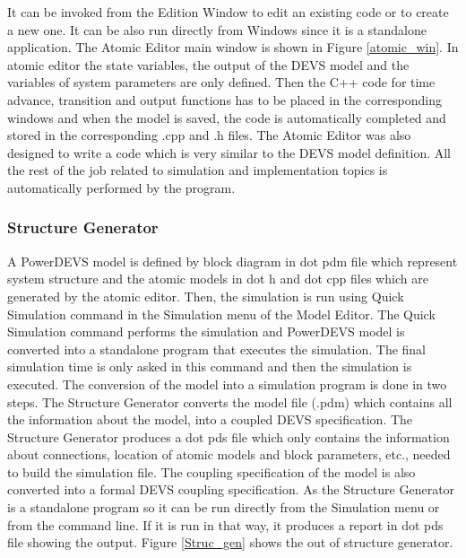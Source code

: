 \documentclass[titlepage]{article}%
\begin{document}
{It can be invoked from the Edition Window to edit an existing code or to create a new one. It can be also run directly from Windows since it is a standalone application. The Atomic Editor main window is shown in Figure \ref{atomic_win}. In atomic editor the state variables, the output of the DEVS model and the variables of system parameters are only defined. Then the C++ code for time advance, transition and output functions has to be placed in the corresponding windows and when the model is saved, the code is automatically completed and stored in the corresponding .cpp and .h files. The Atomic Editor was also designed to write a code which is very similar to the DEVS model definition. All the rest of the job related to simulation and implementation topics is automatically performed by the program.
\subsubsection{Structure Generator}
A PowerDEVS model is defined by block diagram in dot pdm file which represent system structure and the atomic models in dot h and dot cpp files which are generated by the atomic editor. Then, the simulation is run using Quick Simulation command in the Simulation menu of the Model Editor. The Quick Simulation command performs the simulation and PowerDEVS model is converted into a standalone program that executes the simulation. The final simulation time is only asked in this command and then the simulation is executed.
The conversion of the model into a simulation program is done in two steps. The Structure Generator converts the model file (.pdm) which contains all the information about the model, into a coupled DEVS specification. The Structure Generator produces a dot pds file which only contains the information about connections, location of atomic models and block parameters, etc., needed to build the simulation file. The coupling specification of the model is also converted into a formal DEVS coupling specification. As the Structure Generator is a standalone program so it can be run directly from the Simulation menu or from the command line. If it is run in that way, it produces a report in dot pds file showing the output. Figure \ref{Struc_gen} shows the out of structure generator.


}
\end{document}
